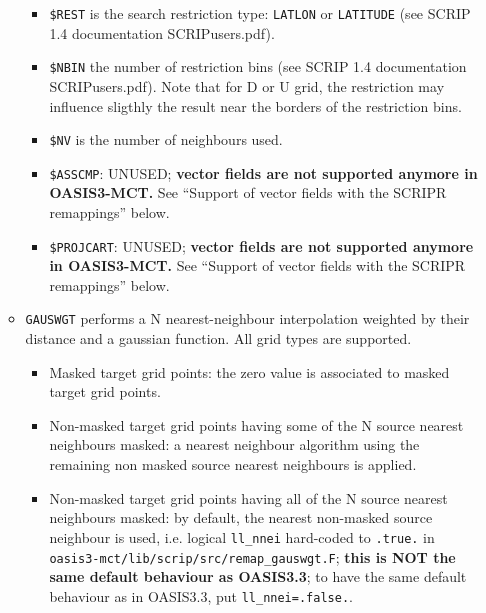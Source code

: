 \begin{itemize}
\begin{itemize}
\begin{itemize}
  \item {\tt \$REST} is the search restriction type: {\tt LATLON}
  or {\tt LATITUDE} (see SCRIP 1.4 documentation SCRIPusers.pdf).
  \item {\tt \$NBIN} the number of restriction bins (see SCRIP 1.4
  documentation SCRIPusers.pdf). Note that for D or U grid, the restriction may influence sligthly the result near the borders of the restriction bins.  
  \item {\tt \$NV} is the number of neighbours used.
  \item {\tt \$ASSCMP}: UNUSED;  {\bf vector fields are not
    supported anymore in OASIS3-MCT.} See ``Support of vector fields
    with the SCRIPR remappings'' below.
  \item {\tt \$PROJCART}: UNUSED;  {\bf vector fields are not
    supported anymore in OASIS3-MCT.} See ``Support of vector fields
    with the SCRIPR remappings'' below.
  \end{itemize}

\item {\tt GAUSWGT} performs a N nearest-neighbour interpolation
  weighted by their distance and a gaussian function. All grid types
  are supported.  
  \begin{itemize}  

  \item Masked target grid points: the zero value is associated to masked
  target grid points.

  \item Non-masked target grid points having some of the N source
  nearest neighbours masked: a nearest neighbour algorithm using the
  remaining non masked source nearest neighbours is applied.

  \item Non-masked target grid points having all of the N source
       nearest neighbours masked: by default, the nearest non-masked
       source neighbour is used, i.e. logical {\tt ll\_nnei} hard-coded to
       {\tt .true.} in {\tt oasis3-mct/lib/scrip/src/remap\_gauswgt.F};
       {\bf this is NOT the same default behaviour as OASIS3.3}; to
       have the same default behaviour as in OASIS3.3, put {\tt ll\_nnei=.false.}. 
  \end{itemize}


\end{itemize}
\end{itemize}

